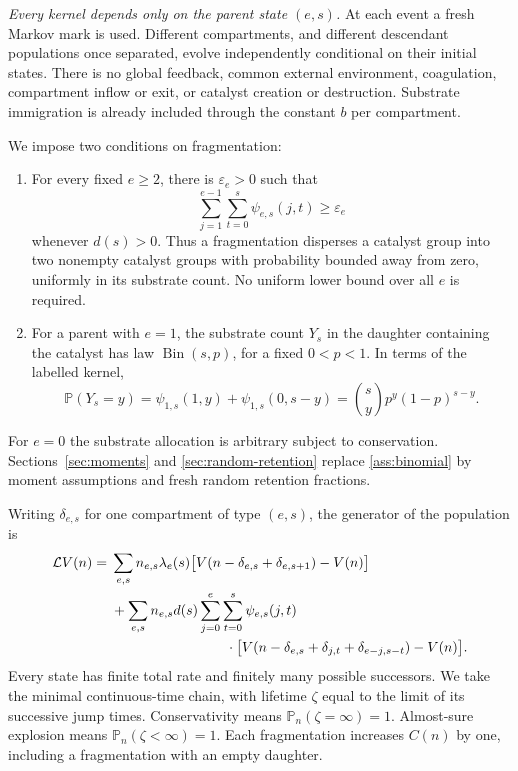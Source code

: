 \documentclass[11pt,a4paper]{article}
\theoremstyle{remark}\newtheorem{remark}[theorem]{Remark}
\newcommand{\Prob}{\mathbb P}
\newcommand{\LL}{\mathcal L}
\begin{document}
\emph{Every kernel depends only on the parent state $(e,s)$.} At each event a fresh Markov mark is used. Different compartments, and different descendant populations once separated, evolve independently conditional on their initial states. There is no global feedback, common external environment, coagulation, compartment inflow or exit, or catalyst creation or destruction. Substrate immigration is already included through the constant $b$ per compartment.

We impose two conditions on fragmentation:
\begin{enumerate}[label=(\textbf{F\arabic*})]
\item\label{ass:dispersion}
For every fixed $e\ge2$, there is $\varepsilon_e>0$ such that
\begin{equation}\label{eq:dispersion}
\sum_{j=1}^{e-1}\sum_{t=0}^s\psi_{e,s}(j,t)\ge\varepsilon_e
\end{equation}
whenever $d(s)>0$. Thus a fragmentation disperses a catalyst group into two nonempty catalyst groups with probability bounded away from zero, uniformly in its substrate count. No uniform lower bound over all $e$ is required.
\item\label{ass:binomial}
For a parent with $e=1$, the substrate count $Y_s$ in the daughter containing the catalyst has law $\operatorname{Bin}(s,p)$, for a fixed $0<p<1$. In terms of the labelled kernel,
\begin{equation}\label{eq:retention}
\Prob(Y_s=y)=\psi_{1,s}(1,y)+\psi_{1,s}(0,s-y)
            =\binom{s}{y}p^y(1-p)^{s-y}.
\end{equation}
\end{enumerate}
For $e=0$ the substrate allocation is arbitrary subject to conservation. Sections~\ref{sec:moments} and \ref{sec:random-retention} replace \ref{ass:binomial} by moment assumptions and fresh random retention fractions.

Writing $\delta_{e,s}$ for one compartment of type $(e,s)$, the generator of the population is
\begin{align}
\LL V(n)
={}&\sum_{e,s} n_{e,s}\lambda_e(s)
 \bigl[V(n-\delta_{e,s}+\delta_{e,s+1})-V(n)\bigr]\nonumber\\
&+\sum_{e,s}n_{e,s}d(s)
 \sum_{j=0}^e\sum_{t=0}^s\psi_{e,s}(j,t)\nonumber\\
&\hspace{29mm}\cdot
 \bigl[V(n-\delta_{e,s}+\delta_{j,t}+\delta_{e-j,s-t})-V(n)\bigr].
\label{eq:population-generator}
\end{align}
Every state has finite total rate and finitely many possible successors. We take the minimal continuous-time chain, with lifetime $\zeta$ equal to the limit of its successive jump times. Conservativity means $\Prob_n(\zeta=\infty)=1$. Almost-sure explosion means $\Prob_n(\zeta<\infty)=1$. Each fragmentation increases $C(n)$ by one, including a fragmentation with an empty daughter.
\end{document}

